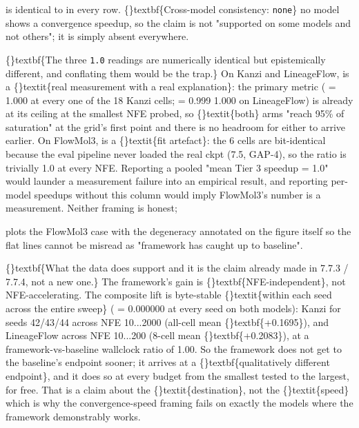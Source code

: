 \documentclass{article}
\begin{document}
 is identical to  in every row. \{\}textbf\{Cross-model consistency: \texttt{none}\}  no model shows a convergence speedup, so the claim is not "supported on some models and not others"; it is simply absent everywhere.

\{\}textbf\{The three \texttt{1.0} readings are numerically identical but epistemically different, and conflating them would be the trap.\} On Kanzi and LineageFlow,  is a \{\}textit\{real measurement with a real explanation\}: the primary metric ( = 1.000 at every one of the 18 Kanzi cells;  = 0.999  1.000 on LineageFlow) is already at its ceiling at the smallest NFE probed, so \{\}textit\{both\} arms "reach 95\% of saturation" at the grid's first point and there is no headroom for either to arrive earlier. On FlowMol3,  is a \{\}textit\{fit artefact\}: the 6 cells are bit-identical because the eval pipeline never loaded the real ckpt (7.5, GAP-4), so the ratio is trivially 1.0 at every NFE. Reporting a pooled "mean Tier 3 speedup = 1.0" would launder a measurement failure into an empirical result, and reporting per-model speedups without this column would imply FlowMol3's number is a measurement. Neither framing is honest;

 plots the FlowMol3 case with the degeneracy annotated on the figure itself so the flat lines cannot be misread as "framework has caught up to baseline".

\{\}textbf\{What the data does support  and it is the claim already made in 7.7.3 / 7.7.4, not a new one.\} The framework's gain is \{\}textbf\{NFE-independent\}, not NFE-accelerating. The composite lift is byte-stable \{\}textit\{within each seed across the entire sweep\} ( = 0.000000 at every seed on both models): Kanzi  for seeds 42/43/44 across NFE 10...2000 (all-cell mean \{\}textbf\{+0.1695\}), and LineageFlow  across NFE 10...200 (8-cell mean \{\}textbf\{+0.2083\}), at a framework-vs-baseline wallclock ratio of  1.00. So the framework does not get to the baseline's endpoint sooner; it arrives at a \{\}textbf\{qualitatively different endpoint\}, and it does so at every budget from the smallest tested to the largest, for free. That is a claim about the \{\}textit\{destination\}, not the \{\}textit\{speed\}  which is why the convergence-speed framing fails on exactly the models where the framework demonstrably works.
\end{document}
